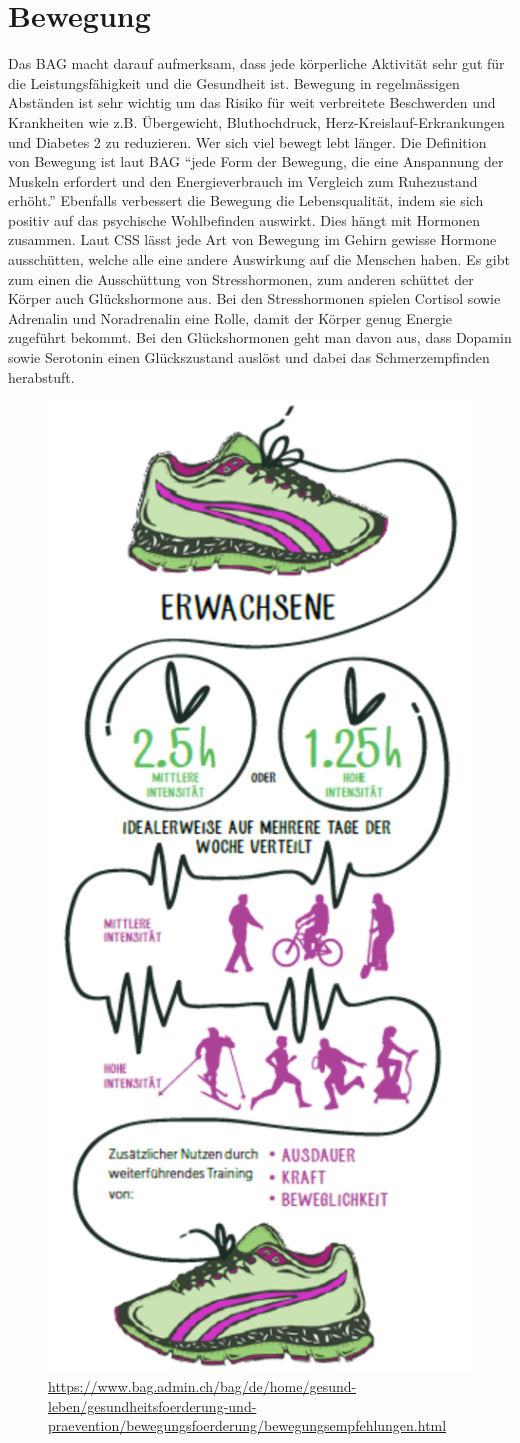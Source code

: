 \section{Bewegung}
Das BAG macht darauf aufmerksam, dass jede körperliche Aktivität sehr gut für die Leistungsfähigkeit und die Gesundheit ist. Bewegung in regelmässigen Abständen ist sehr wichtig um das Risiko für weit verbreitete Beschwerden und Krankheiten wie z.B. Übergewicht, Bluthochdruck, Herz-Kreislauf-Erkrankungen und Diabetes 2 zu reduzieren.
\newline
Wer sich viel bewegt lebt länger. Die Definition von Bewegung ist laut BAG “jede Form der Bewegung, die eine Anspannung der Muskeln erfordert und den Energieverbrauch im Vergleich zum Ruhezustand erhöht.”\cite{gesundheit_definition}
\newline
Ebenfalls verbessert die Bewegung die Lebensqualität, indem sie sich positiv auf das psychische Wohlbefinden auswirkt. Dies hängt mit Hormonen zusammen. Laut CSS lässt jede Art von Bewegung im Gehirn gewisse Hormone ausschütten, welche alle eine andere Auswirkung auf die Menschen haben.\cite{hormone-bei-bewegung} Es gibt zum einen die Ausschüttung von Stresshormonen, zum anderen schüttet der Körper auch Glückshormone aus. Bei den Stresshormonen spielen Cortisol sowie Adrenalin und Noradrenalin eine Rolle, damit der Körper genug Energie zugeführt bekommt. Bei den Glückshormonen geht man davon aus, dass Dopamin sowie Serotonin einen Glückszustand auslöst und dabei das Schmerzempfinden herabstuft.
\begin{figure}[!ht]
  \centering
  \includegraphics[width=0.38\linewidth]{./images/bewegungsempfehlungen-ew-dt.png}
  \caption{Grafik von BAG zur Bewegungsempfehlung von Erwachsenen Menschen.}
  \label{fig:bewegungsempfehlungen}
  \caption*{\url{https://www.bag.admin.ch/bag/de/home/gesund-leben/gesundheitsfoerderung-und-praevention/bewegungsfoerderung/bewegungsempfehlungen.html}}
\end{figure}

